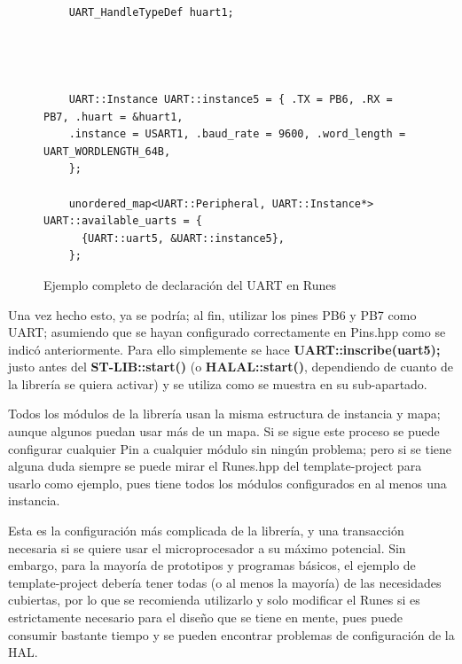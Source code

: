 \documentclass{report}
\begin{document}
\begin{figure}[h]
  \begin{lstlisting}
    UART_HandleTypeDef huart1;




    UART::Instance UART::instance5 = { .TX = PB6, .RX = PB7, .huart = &huart1,
    .instance = USART1, .baud_rate = 9600, .word_length = UART_WORDLENGTH_64B,
    };

    unordered_map<UART::Peripheral, UART::Instance*> UART::available_uarts = {
      {UART::uart5, &UART::instance5},
    };
  \end{lstlisting}
\caption{Ejemplo completo de declaración del UART en Runes}
\label{UARTfullRunes}
\end{figure}
\par \vspace{0.3cm}

Una vez hecho esto, ya se podría; al fin, utilizar los pines PB6 y PB7 como UART; asumiendo que se hayan configurado correctamente en Pins.hpp como se indicó anteriormente. Para ello simplemente se hace \textbf{UART::inscribe(uart5);} justo antes del \textbf{ST-LIB::start()} (o \textbf{HALAL::start()}, dependiendo de cuanto de la librería se quiera activar) y se utiliza como se muestra en su sub-apartado. 
\par \vspace{0.3cm}
Todos los módulos de la librería usan la misma estructura de instancia y mapa; aunque algunos puedan usar más de un mapa. Si se sigue este proceso se puede configurar cualquier Pin a cualquier módulo sin ningún problema; pero si se tiene alguna duda siempre se puede mirar el Runes.hpp del template-project para usarlo como ejemplo, pues tiene todos los módulos configurados en al menos una instancia. 
\par \vspace{0.3cm}
Esta es la configuración más complicada de la librería, y una transacción necesaria si se quiere usar el microprocesador a su máximo potencial. Sin embargo, para la mayoría de prototipos y programas básicos, el ejemplo de template-project debería tener todas (o al menos la mayoría) de las necesidades cubiertas, por lo que se recomienda utilizarlo y solo modificar el Runes si es estrictamente necesario para el diseño que se tiene en mente, pues puede consumir bastante tiempo y se pueden encontrar problemas de configuración de la HAL. 
\end{document}
